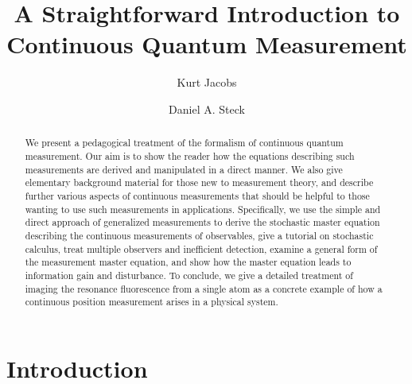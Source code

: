 \documentclass[aps,twocolumn,superscriptaddress,footinbib,floatfix,showpacs]{revtex4}
\begin{document}
\title{A Straightforward Introduction to Continuous Quantum Measurement}


\author{Kurt Jacobs}

\author{Daniel A. Steck}


\begin{abstract}
We present a pedagogical treatment of the formalism of continuous
quantum measurement.  Our aim is to show the reader how the equations
describing such measurements are derived and manipulated in a direct
manner.  We also give elementary background material for those new to
measurement theory, and describe further various aspects of continuous
measurements that should be helpful to those wanting to use such
measurements in applications.  Specifically, we use the simple
and direct approach of
generalized measurements to derive the stochastic master equation
describing the continuous measurements of observables, give a tutorial
on stochastic calculus, treat multiple observers and inefficient
detection, examine a general form of the measurement master equation,
and show how the master equation leads to information gain and
disturbance.  To conclude, we give a detailed treatment of imaging the
resonance fluorescence from a single atom as a concrete example of how
a continuous position measurement arises in a physical system.
\end{abstract}

\maketitle

\section{Introduction}
\end{document}
